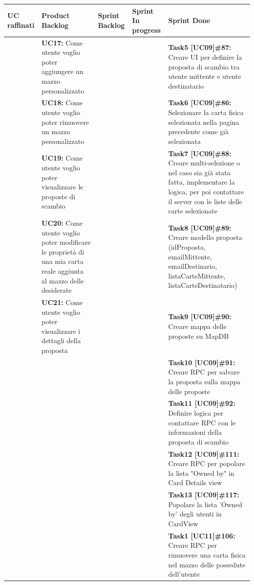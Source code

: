\documentclass[a4paper, oneside]{article}
\begin{document}
\begin{landscape}
        \newpage
        \small
        \def\arraystretch{2}%
        \noindent
        \begin{tabular}{ | p{5cm} | p{5cm} | p{3cm} | p{3cm} | p{7cm}| }
            \hline
            \textbf{UC raffinati}
            & \textbf{Product Backlog}
            & \textbf{Sprint Backlog}
            & \textbf{Sprint In progress}
            & \textbf{Sprint Done} \\
            \hline
            \hline
            & \textbf{UC17:} Come utente voglio poter aggiungere un mazzo personalizzato  &  & & \textbf{Task5 [UC09]\#87:} Creare UI per definire la proposta di scambio tra utente mittente e utente destinatario \\
            \hline
            & \textbf{UC18:} Come utente voglio poter rimuovere un mazzo personalizzato  & & & \textbf{Task6 [UC09]\#86:} Selezionare la carta fisica selezionata nella pagina precedente come già selezionata\\
            \hline
            & \textbf{UC19:} Come utente voglio poter visualizzare le proposte di scambio & & & \textbf{Task7 [UC09]\#88:} Creare multi-selezione o nel caso sia già stata fatta, implementare la logica, per poi contattare il server con le liste delle carte selezionate  \\
            \hline
            & \textbf{UC20:} Come utente voglio poter modificare le proprietà di una mia carta reale aggiunta al mazzo delle desiderate & & & \textbf{Task8 [UC09]\#89:} Creare modello proposta (idProposta, emailMittente, emailDestinario, listaCarteMittente, listaCarteDestinatario)  \\
            \hline
            & \textbf{UC21:} Come utente voglio poter visualizzare i dettagli della proposta & & & \textbf{Task9 [UC09]\#90:} Creare mappa delle proposte su MapDB  \\
            \hline
            & & & & \textbf{Task10 [UC09]\#91:} Creare RPC per salvare la proposta sulla mappa delle proposte  \\
            \hline
            & & & & \textbf{Task11 [UC09]\#92:} Definire logica per contattare RPC con le informazioni della proposta di scambio  \\
            \hline
            & & & & \textbf{Task12 [UC09]\#111:} Creare RPC per popolare la lista "Owned by" in Card Details view  \\
            \hline
            & & & & \textbf{Task13 [UC09]\#117:} Popolare la lista 'Owned by' degli utenti in CardView  \\
            \hline
            & & & & \textbf{Task1 [UC11]\#106:}  Creare RPC per rimuovere una carta fisica nel mazzo delle possedute dell'utente \\
            \hline
        \end{tabular}



\end{landscape}
\end{document}

